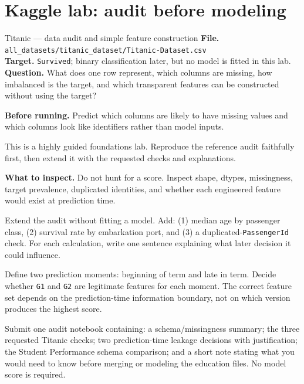 \section{Kaggle lab: audit before modeling}
\label{sec:kaggle-titanic-audit}

\begin{kaggleproject}{Titanic --- data audit and simple feature construction}
\textbf{File.} \texttt{all\_datasets/titanic\_dataset/Titanic-Dataset.csv}\\
\textbf{Target.} \texttt{Survived}; binary classification later, but no model is fitted in this lab.\\
\textbf{Question.} What does one row represent, which columns are missing, how imbalanced is the target, and which transparent features can be constructed without using the target?

\textbf{Before running.} Predict which columns are likely to have missing values and which columns look like identifiers rather than model inputs.

\begin{labmode}
This is a highly guided foundations lab. Reproduce the reference audit faithfully first, then extend it with the requested checks and explanations.
\end{labmode}



\textbf{What to inspect.} Do not hunt for a score. Inspect shape, dtypes, missingness, target prevalence, duplicated identities, and whether each engineered feature would exist at prediction time.

\begin{tryit}
Extend the audit without fitting a model. Add: (1) median age by passenger class, (2) survival rate by embarkation port, and (3) a duplicated-\texttt{PassengerId} check. For each calculation, write one sentence explaining what later decision it could influence.
\end{tryit}
\end{kaggleproject}


\begin{decisionmemo}
Define two prediction moments: beginning of term and late in term. Decide whether \texttt{G1} and \texttt{G2} are legitimate features for each moment. The correct feature set depends on the prediction-time information boundary, not on which version produces the highest score.
\end{decisionmemo}

\begin{labdeliverable}
Submit one audit notebook containing: a schema/missingness summary; the three requested Titanic checks; two prediction-time leakage decisions with justification; the Student Performance schema comparison; and a short note stating what you would need to know before merging or modeling the education files. No model score is required.
\end{labdeliverable}
